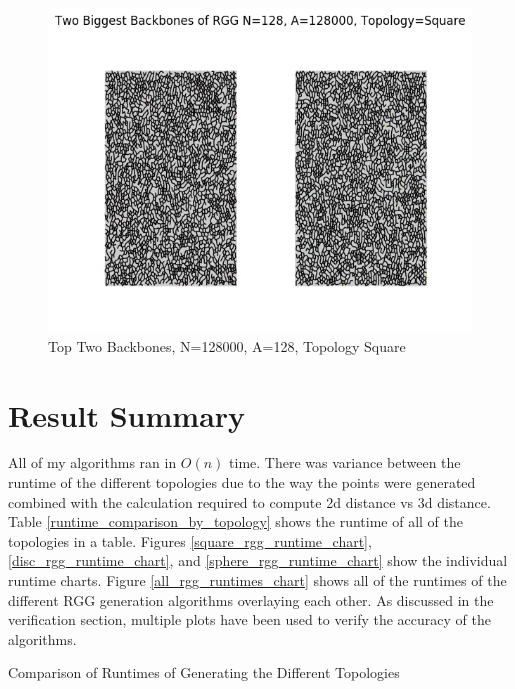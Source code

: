 \documentclass{article}
\begin{document}
    \begin{figure}
      \centering
      \label{backbone_128_128000_Square}
      \includegraphics[width=1 \textwidth]{backbone/backbone_128_128000_Square.png}
      \caption{Top Two Backbones, N=128000, A=128, Topology Square}
    \end{figure}

\section{Result Summary}
  All of my algorithms ran in $O(n)$ time.
  There was variance between the runtime of the different topologies due to the way the points were generated combined with the calculation required to compute 2d distance vs 3d distance.
  Table \ref{runtime_comparison_by_topology} shows the runtime of all of the topologies in a table.
  Figures \ref{square_rgg_runtime_chart}, \ref{disc_rgg_runtime_chart}, and \ref{sphere_rgg_runtime_chart} show the individual runtime charts.
  Figure \ref{all_rgg_runtimes_chart} shows all of the runtimes of the different RGG generation algorithms overlaying each other.
  As discussed in the verification section, multiple plots have been used to verify the accuracy of the algorithms.

  \begin{table}
    \centering
    \label{runtime_comparison_by_topology}
	  \caption{Comparison of Runtimes of Generating the Different Topologies}
  \end{table}
\end{document}
